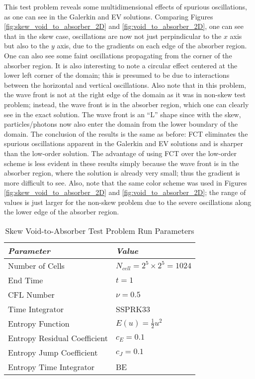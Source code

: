 This test problem reveals some multidimensional effects of spurious
oscillations, as one can see in the Galerkin and EV solutions. Comparing
Figures \ref{fig:skew_void_to_absorber_2D} and \ref{fig:void_to_absorber_2D},
one can see that in the skew case, oscillations are now not just perpindicular
to the $x$ axis but also to the $y$ axis, due to the gradients on each
edge of the absorber region. One can also see some faint oscillations
propagating from the corner of the absorber region. It is also interesting
to note a circular effect centered at the lower left corner of the domain;
this is presumed to be due to interactions between the horizontal and
vertical oscillations. Also note that in this problem, the wave front
is not at the right edge of the domain as it was in non-skew test
problem; instead, the wave front is in the absorber region, which
one can clearly see in the exact solution. The wave front is an ``L''
shape since with the skew, particles/photons now also enter the domain
from the lower boundary of the domain. The conclusion of the results
is the same as before: FCT eliminates the spurious oscillations apparent
in the Galerkin and EV solutions and is sharper than the low-order
solution. The advantage of using FCT over the low-order scheme is
less evident in these results simply because the wave front is
in the absorber region, where the solution is already very small;
thus the gradient is more difficult to see. Also, note that the same
color scheme was used in
Figures \ref{fig:skew_void_to_absorber_2D} and \ref{fig:void_to_absorber_2D};
the range of values is just larger for the non-skew problem due to the
severe oscillations along the lower edge of the absorber region.
\begin{table}[ht]\caption{Skew Void-to-Absorber Test Problem Run Parameters}
\label{tab:skew_void_to_absorber_run_parameters}
\centering
\begin{tabular}{l l}\toprule
\emph{Parameter} & \emph{Value}\\\midrule
Number of Cells & $N_{cell} = 2^5 \times 2^5 = 1024$\\
End Time & $t = 1$\\
CFL Number & $\nu = 0.5$\\
Time Integrator & SSPRK33\\\midrule
Entropy Function & $E(u) = \frac{1}{2}u^2$\\
Entropy Residual Coefficient & $c_E = 0.1$\\
Entropy Jump Coefficient & $c_J = 0.1$\\
Entropy Time Integrator & BE\\
\bottomrule\end{tabular}
\end{table}
